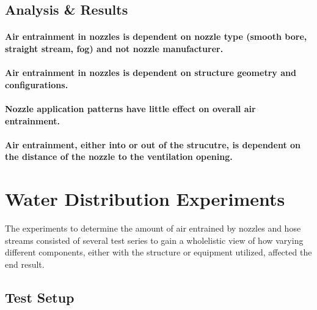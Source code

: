 \documentclass{article}
\begin{document}
\subsection{Analysis \& Results}

\vspace*{\baselineskip}
\paragraph{Air entrainment in nozzles is dependent on nozzle type (smooth bore, straight stream, fog) and not nozzle manufacturer.} \mbox{}



\paragraph{Air entrainment in nozzles is dependent on structure geometry and configurations.} \mbox{}



\paragraph{Nozzle application patterns have little effect on overall air entrainment.} \mbox{}



\paragraph{Air entrainment, either into or out of the strucutre, is dependent on the distance of the nozzle to the ventilation opening.} \mbox{}



\vspace*{\baselineskip}

\clearpage

\section{Water Distribution Experiments}

The experiments to determine the amount of air entrained by nozzles and hose streams consisted of several test series to gain a wholelistic view of how varying different components, either with the structure or equipment utilized, affected the end result.

\subsection{Test Setup}
\end{document}
